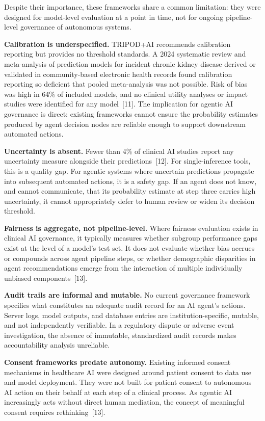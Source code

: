 Despite their importance, these frameworks share a common limitation:
they were designed for model-level evaluation at a point in time, not
for ongoing pipeline-level governance of autonomous systems.

\textbf{Calibration is underspecified.} TRIPOD+AI recommends calibration
reporting but provides no threshold standards. A 2024 systematic review
and meta-analysis of prediction models for incident chronic kidney
disease derived or validated in community-based electronic health
records found calibration reporting so deficient that pooled
meta-analysis was not possible. Risk of bias was high in 64\% of
included models, and no clinical utility analyses or impact studies were
identified for any model~{[}11{]}. The implication for agentic AI
governance is direct: existing frameworks cannot ensure the probability
estimates produced by agent decision nodes are reliable enough to
support downstream automated actions.

\textbf{Uncertainty is absent.} Fewer than 4\% of clinical AI studies
report any uncertainty measure alongside their predictions~{[}12{]}. For
single-inference tools, this is a quality gap. For agentic systems where
uncertain predictions propagate into subsequent automated actions, it is
a safety gap. If an agent does not know, and cannot communicate, that
its probability estimate at step three carries high uncertainty, it
cannot appropriately defer to human review or widen its decision
threshold.

\textbf{Fairness is aggregate, not pipeline-level.} Where fairness
evaluation exists in clinical AI governance, it typically measures
whether subgroup performance gaps exist at the level of a model's test
set. It does not evaluate whether bias accrues or compounds across agent
pipeline steps, or whether demographic disparities in agent
recommendations emerge from the interaction of multiple individually
unbiased components~{[}13{]}.

\textbf{Audit trails are informal and mutable.} No current governance
framework specifies what constitutes an adequate audit record for an AI
agent's actions. Server logs, model outputs, and database entries are
institution-specific, mutable, and not independently verifiable. In a
regulatory dispute or adverse event investigation, the absence of
immutable, standardized audit records makes accountability analysis
unreliable.

\textbf{Consent frameworks predate autonomy.} Existing informed consent
mechanisms in healthcare AI were designed around patient consent to data
use and model deployment. They were not built for patient consent to
autonomous AI action on their behalf at each step of a clinical process.
As agentic AI increasingly acts without direct human mediation, the
concept of meaningful consent requires rethinking~{[}13{]}.


